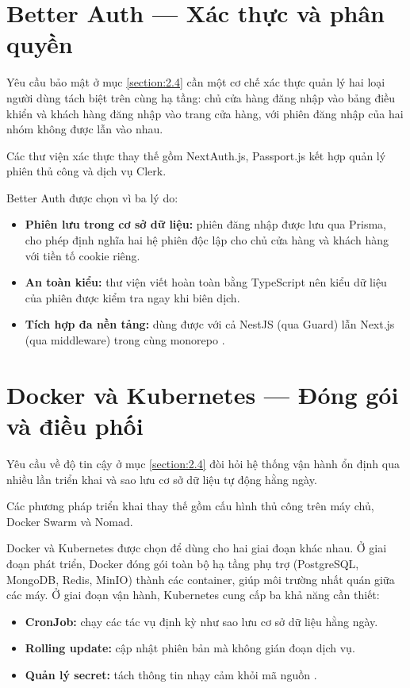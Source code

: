 \documentclass[../main.tex]{subfiles}
\begin{document}
\section{Better Auth --- Xác thực và phân quyền}
\label{section:3.8}

Yêu cầu bảo mật ở mục \ref{section:2.4} cần một cơ chế xác thực quản lý hai loại người dùng tách biệt trên cùng hạ tầng: chủ cửa hàng đăng nhập vào bảng điều khiển và khách hàng đăng nhập vào trang cửa hàng, với phiên đăng nhập của hai nhóm không được lẫn vào nhau.

Các thư viện xác thực thay thế gồm NextAuth.js, Passport.js kết hợp quản lý phiên thủ công và dịch vụ Clerk.

Better Auth được chọn vì ba lý do:

\begin{itemize}
    \item \textbf{Phiên lưu trong cơ sở dữ liệu:} phiên đăng nhập được lưu qua Prisma, cho phép định nghĩa hai hệ phiên độc lập cho chủ cửa hàng và khách hàng với tiền tố cookie riêng.
    \item \textbf{An toàn kiểu:} thư viện viết hoàn toàn bằng TypeScript nên kiểu dữ liệu của phiên được kiểm tra ngay khi biên dịch.
    \item \textbf{Tích hợp đa nền tảng:} dùng được với cả NestJS (qua Guard) lẫn Next.js (qua middleware) trong cùng monorepo \cite{betterauth_docs}.
\end{itemize}

\section{Docker và Kubernetes --- Đóng gói và điều phối}
\label{section:3.9}

Yêu cầu về độ tin cậy ở mục \ref{section:2.4} đòi hỏi hệ thống vận hành ổn định qua nhiều lần triển khai và sao lưu cơ sở dữ liệu tự động hằng ngày.

Các phương pháp triển khai thay thế gồm cấu hình thủ công trên máy chủ, Docker Swarm và Nomad.

Docker và Kubernetes được chọn để dùng cho hai giai đoạn khác nhau. Ở giai đoạn phát triển, Docker đóng gói toàn bộ hạ tầng phụ trợ (PostgreSQL, MongoDB, Redis, MinIO) thành các container, giúp môi trường nhất quán giữa các máy. Ở giai đoạn vận hành, Kubernetes cung cấp ba khả năng cần thiết:

\begin{itemize}
    \item \textbf{CronJob:} chạy các tác vụ định kỳ như sao lưu cơ sở dữ liệu hằng ngày.
    \item \textbf{Rolling update:} cập nhật phiên bản mà không gián đoạn dịch vụ.
    \item \textbf{Quản lý secret:} tách thông tin nhạy cảm khỏi mã nguồn \cite{kubernetes_docs, docker_docs}.
\end{itemize}
\end{document}
